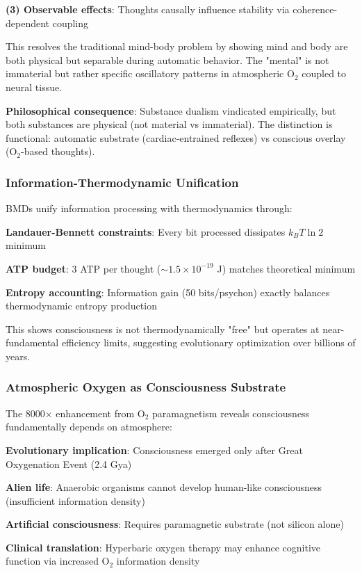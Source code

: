 \documentclass[11pt,onecolumn]{article}
\begin{document}
\textbf{(3) Observable effects}: Thoughts causally influence stability via coherence-dependent coupling

This resolves the traditional mind-body problem by showing mind and body are both physical but separable during automatic behavior. The "mental" is not immaterial but rather specific oscillatory patterns in atmospheric O$_2$ coupled to neural tissue.

\textbf{Philosophical consequence}: Substance dualism vindicated empirically, but both substances are physical (not material vs immaterial). The distinction is functional: automatic substrate (cardiac-entrained reflexes) vs conscious overlay (O$_2$-based thoughts).

\subsubsection{Information-Thermodynamic Unification}

BMDs unify information processing with thermodynamics through:

\textbf{Landauer-Bennett constraints}: Every bit processed dissipates $k_B T \ln 2$ minimum

\textbf{ATP budget}: 3 ATP per thought ($\sim 1.5 \times 10^{-19}$ J) matches theoretical minimum

\textbf{Entropy accounting}: Information gain (50 bits/psychon) exactly balances thermodynamic entropy production

This shows consciousness is not thermodynamically "free" but operates at near-fundamental efficiency limits, suggesting evolutionary optimization over billions of years.

\subsubsection{Atmospheric Oxygen as Consciousness Substrate}

The 8000$\times$ enhancement from O$_2$ paramagnetism reveals consciousness fundamentally depends on atmosphere:

\textbf{Evolutionary implication}: Consciousness emerged only after Great Oxygenation Event (2.4 Gya)

\textbf{Alien life}: Anaerobic organisms cannot develop human-like consciousness (insufficient information density)

\textbf{Artificial consciousness}: Requires paramagnetic substrate (not silicon alone)

\textbf{Clinical translation}: Hyperbaric oxygen therapy may enhance cognitive function via increased O$_2$ information density
\end{document}
